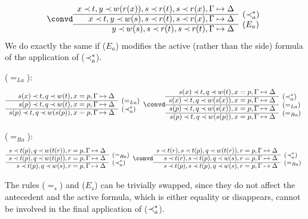 \begin{PROOF}
\begin{LS}
\[	  \convd
 \begin{array}{rl}
x\Incl t, y\Incl w(r(x)), s\Incl r(t), s\Incl r(x),\GSD \\ \cline{1-1}
x\Incl t, y\Incl w(s), s\Incl r(t), s\Incl r(x),\GSD  & \rabove{(\Incl_a^*)} \\ \cline{1-1}
          y\Incl w(s), s\Incl r(t), s\Incl r(t),\GSD  & \rabove{(E_a)} \end{array} \]
%
We do exactly the same if ($E_a$) modifies the active (rather than the side)
formula of the application of ($\mathbin{\prec}_a^*$).
\item ($=_{La}$):
\[ \begin{array}{rl}
s(x)\Incl t, q\Incl w(t), x=p, \GSD \\ \cline{1-1}
s(p)\Incl t, q\Incl w(t), x=p, \GSD & \rabove{(=_{La})} \\ \cline{1-1}
s(p)\Incl t, q\Incl w(s(p)), x=p, \GSD & \rabove{(\Incl_a^*)} \end{array} \convd
 \begin{array}{rl}
s(x)\Incl t, q\Incl w(t), x=p, \GSD \\ \cline{1-1}
s(x)\Incl t, q\Incl w(s(x)), x=p, \GSD & \rabove{(\Incl_a^*)} \\ \cline{1-1}
s(p)\Incl t, q\Incl w(s(x)), x=p, \GSD & \rabove{(=_{La})} \\ \cline{1-1}
s(p)\Incl t, q\Incl w(s(p)), x=p, \GSD & \rabove{(=_{Ra})} 
\end{array} \]
\item ($=_{Ra}$):
\[ \begin{array}{rl}
s\Incl t(p), q\Incl w(t(r)), r=p, \GSD \\ \cline{1-1}
s\Incl t(p), q\Incl w(t(p)), r=p, \GSD & \rabove{(=_{Ra})}\\ \cline{1-1}
s\Incl t(p), q\Incl w(s), r=p, \GSD & \rabove{(\Incl_a^*)} \end{array} \convd
 \begin{array}{rl}
s\Incl t(r), s\Incl t(p), q\Incl w(t(r)), r=p, \GSD \\ \cline{1-1}
s\Incl t(r), s\Incl t(p), q\Incl w(s), r=p, \GSD & \rabove{(\Incl_a^*)} \\ \cline{1-1}
s\Incl t(p), s\Incl t(p), q\Incl w(s), r=p, \GSD & \rabove{(=_{Ra})} \end{array} \]
%
\item The rules ($=_s$) and ($E_s$) can be trivially swapped, since they do
not affect the antecedent and the active formula, which is either equality or
disappears, cannot be involved in the final application of ($\mathbin{\prec}_a^*$).
\end{LS}
\end{PROOF}
